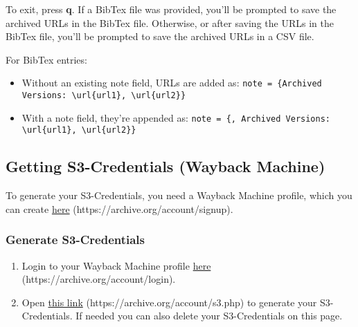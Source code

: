 To exit, press \textbf{q}. If a BibTex file was provided, you'll be prompted to save the archived URLs in the BibTex file. Otherwise, or after saving the URLs in the BibTex file, you'll be prompted to save the archived URLs in a CSV file.

For BibTex entries:
\begin{itemize}
	\item Without an existing note field, URLs are added as: \texttt{note = \{Archived Versions: \textbackslash url\{url1\}, \textbackslash url\{url2\}\}}
	\item With a note field, they're appended as: \texttt{note = \{<current note>, Archived Versions: \textbackslash url\{url1\}, \textbackslash url\{url2\}\}}
\end{itemize}


\subsection{Getting S3-Credentials (Wayback Machine)}\label{sub:get_cred_api}

To generate your S3-Credentials, you need a Wayback Machine profile, which you can create \href{https://archive.org/account/signup}{here} (https://archive.org/account/signup).

\subsubsection{Generate S3-Credentials}
\begin{enumerate}
	\item Login to your Wayback Machine profile \href{https://archive.org/account/login}{here} (https://archive.org/account/login).
	\item Open \href{https://archive.org/account/s3.php}{this link} (https://archive.org/account/s3.php) to generate your S3-Credentials. If needed you can also delete your S3-Credentials on this page. 
\end{enumerate}